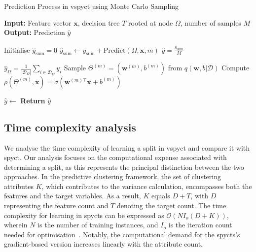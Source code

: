 \documentclass[3p,review,authoryear]{elsarticle}
\begin{document}
\begin{algorithm}[h!]
\caption{Prediction Process in \gls{vspyct} using Monte Carlo Sampling}
\label{alg:make_pred}
\begin{algorithmic}[1]

\State \textbf{Input:} Feature vector $\mathbf{x}$, decision tree $T$ rooted at node $\Omega$, number of samples $M$
\State \textbf{Output:} Prediction $\hat{y}$

    \State Initialise $\hat{y}_{\text{sum}} = 0$
        \State $\hat{y}_{\text{sum}} \gets \hat{y}_{\text{sum}} + \text{Predict}(\Omega, \mathbf{x}, m)$
    \EndFor
    \State \Return $\hat{y} = \frac{\hat{y}_{\text{sum}}}{M}$
\EndFunction

        \State \Return $\hat{y}_\Omega = \frac{1}{|\mathcal{D}_\Omega|} \sum_{i \in \mathcal{D}_\Omega} y_i$
    \Else
        \State Sample $\Theta^{(m)} = (\mathbf{w}^{(m)}, b^{(m)})$ from $q(\mathbf{w}, b|\mathcal{D})$
        \State Compute $\rho(\Theta^{(m)}, \mathbf{x}) = \sigma(\mathbf{w}^{(m)\top} \mathbf{x} + b^{(m)})$
            \State \Return {}
        \Else
            \State \Return {}
        \EndIf
    \EndIf
\EndFunction

\State \(\hat{y} \gets \) 
\State \textbf{Return} $\hat{y}$

\end{algorithmic}
\end{algorithm}

\subsection{Time complexity analysis}

We analyse the time complexity of learning a split in \gls{vspyct} and compare it with \gls{spyct}.
Our analysis focuses on the computational expense associated with determining a split, as this represents the principal distinction between the two approaches.
In the predictive clustering framework, the set of clustering attributes $K$, which contributes to the variance calculation, encompasses both the features and the target variables.
As a result, $K$ equals $D + T$, with $D$ representing the feature count and $T$ denoting the target count.
The time complexity for learning in \glspl{spyct} can be expressed as $\mathcal{O}(NI_o(D+K))$, wherein $N$ is the number of training instances, and $I_o$ is the iteration count needed for optimisation~\citep{Stepi_nik_2021}.
Notably, the computational demand for the \glspl{spyct}'s gradient-based version increases linearly with the attribute count.
\end{document}
